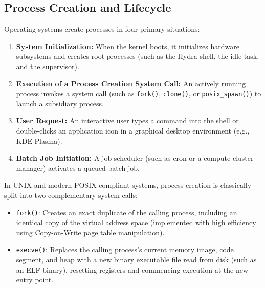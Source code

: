 \subsection{Process Creation and Lifecycle}
Operating systems create processes in four primary situations:
\begin{enumerate}
    \item \textbf{System Initialization:} When the kernel boots, it initializes hardware subsystems and creates root processes (such as the Hydra shell, the idle task, and the supervisor).
    \item \textbf{Execution of a Process Creation System Call:} An actively running process invokes a system call (such as \texttt{fork()}, \texttt{clone()}, or \texttt{posix\_spawn()}) to launch a subsidiary process.
    \item \textbf{User Request:} An interactive user types a command into the shell or double-clicks an application icon in a graphical desktop environment (e.g., KDE Plasma).
    \item \textbf{Batch Job Initiation:} A job scheduler (such as cron or a compute cluster manager) activates a queued batch job.
\end{enumerate}

In UNIX and modern POSIX-compliant systems, process creation is classically split into two complementary system calls:
\begin{itemize}
    \item \texttt{fork()}: Creates an exact duplicate of the calling process, including an identical copy of the virtual address space (implemented with high efficiency using Copy-on-Write page table manipulation).
    \item \texttt{execve()}: Replaces the calling process's current memory image, code segment, and heap with a new binary executable file read from disk (such as an ELF binary), resetting registers and commencing execution at the new entry point.
\end{itemize}


